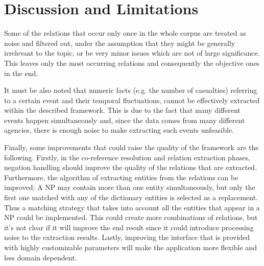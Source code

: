 \documentclass[]{article}
\begin{document}
\section{Discussion and Limitations}
%
Some of the relations that occur only once in the whole corpus are treated as noise and filtered out, under the assumption that they might be generally irrelevant to the topic, or be very minor issues which are not of large significance. This leaves only the most occurring relations and consequently the objective ones in the end.

It must be also noted that numeric facts (e.g. the number of casualties) referring to a certain event and their temporal fluctuations, cannot be effectively extracted within the described framework. This is due to the fact that many different events happen simultaneously and, since the data comes from many different agencies, there is enough noise to make extracting such events unfeasible.

Finally, some improvements that could raise the quality of the framework are the following. Firstly, in the co-reference resolution and relation extraction phases, negation handling  should improve the quality of the relations that are extracted. Furthermore, the algorithm of extracting entities from the relations can be improved; A NP may contain more than one entity simultaneously, but only the first one matched with any of the dictionary entities is selected as a replacement. Thus a matching strategy that takes into account all the entities that appear in a NP could be implemented. This could create more combinations of relations, but it's not clear if it will improve the end result since it could introduce processing noise to the extraction results. Lastly, improving the interface that is provided with highly customizable parameters will make the application more flexible and less domain dependent.
%
\end{document}
